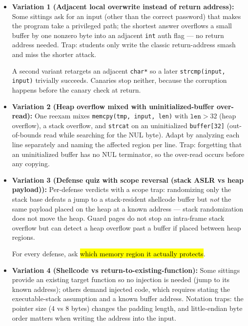 \documentclass[12pt, a4paper]{article}
\newcommand{\imp}[1]{\hl{#1}}                       %
\begin{document}
\begin{trapbox}
\begin{itemize}
    \item \textbf{Variation 1 (Adjacent local overwrite instead of return address):} Some sittings ask for an input (other than the correct password) that makes the program take a privileged path; the shortest answer overflows a small buffer by one nonzero byte into an adjacent \texttt{int} auth flag --- no return address needed. Trap: students only write the classic return-address smash and miss the shorter attack.

    A second variant retargets an adjacent \texttt{char*} so a later \texttt{strcmp(input, input)} trivially succeeds. Canaries stop neither, because the corruption happens before the canary check at return.
    \item \textbf{Variation 2 (Heap overflow mixed with uninitialized-buffer over-read):} One reexam mixes \texttt{memcpy(tmp, input, len)} with $\texttt{len} > 32$ (heap overflow), a stack overflow, and \texttt{strcat} on an uninitialized \texttt{buffer[32]} (out-of-bounds read while searching for the NUL byte).
    Adapt by analyzing each line separately and naming the affected region per line. Trap: forgetting that an uninitialized buffer has no NUL terminator, so the over-read occurs before any copying.
    \item \textbf{Variation 3 (Defense quiz with scope reversal (stack ASLR vs heap payload)):} Per-defense verdicts with a scope trap: randomizing only the stack base defeats a jump to a stack-resident shellcode buffer but \emph{not} the same payload placed on the heap at a known address --- stack randomization does not move the heap.
    Guard pages do not stop an intra-frame stack overflow but can detect a heap overflow past a buffer if placed between heap regions.

    For every defense, ask \imp{which memory region it actually protects}.
    \item \textbf{Variation 4 (Shellcode vs return-to-existing-function):} Some sittings provide an existing target function so no injection is needed (jump to its known address); others demand injected code, which requires stating the executable-stack assumption and a known buffer address.
    Notation traps: the pointer size (4 vs 8 bytes) changes the padding length, and little-endian byte order matters when writing the address into the input.
\end{itemize}
\end{trapbox}
\end{document}
